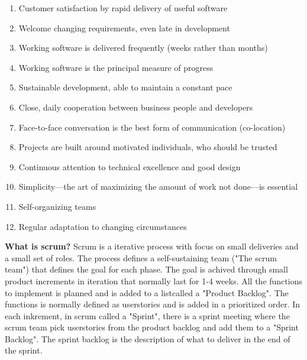 \begin{enumerate}
    \item Customer satisfaction by rapid delivery of useful software
    \item Welcome changing requirements, even late in development
    \item Working software is delivered frequently (weeks rather than months)
    \item Working software is the principal measure of progress
    \item Sustainable development, able to maintain a constant pace
    \item Close, daily cooperation between business people and developers
    \item Face-to-face conversation is the best form of communication (co-location)
    \item Projects are built around motivated individuals, who should be trusted
    \item Continuous attention to technical excellence and good design
    \item Simplicity—the art of maximizing the amount of work not done—is essential
    \item Self-organizing teams
    \item Regular adaptation to changing circumstances
\end{enumerate}


{\bf What is scrum? } Scrum is a iterative process with focus on small deliveries and a small set of roles. 
The process defines a self-sustaining team ("The scrum team") that defines the goal for each phase. The goal 
is achived through small product increments in iteration that normally last for 1-4 weeks. 
All the functions to implement is planned and is added to a listcalled a "Product Backlog". The
functions is normally defined as userstories and is added in a prioritized order. In each inkrement, 
in scrum called a "Sprint", there is a sprint meeting where the scrum team pick userstories from the 
product backlog and add them to a "Sprint Backlog". The sprint backlog is the description of what 
to deliver in the end of the sprint.

